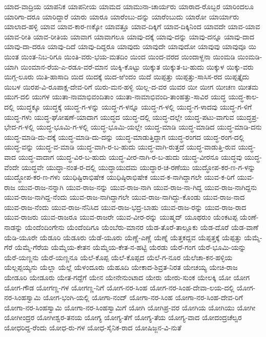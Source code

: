 ಯಾದ-ವಾದ್ರಿಯ
ಯಾಪನಿಕ
ಯಾಪನೀಯ
ಯಾಮದ
ಯಾಮುನಾ-ಚಾರ್ಯರು
ಯಾರಾದ-ರೊಬ್ಬರ
ಯಾರಿಂದಲೂ
ಯಾರಿಗಾ-ದರೂ
ಯಾರಿದ್ದಾರೆ
ಯಾರು
ಯಾರೂ
ಯಾರೆಂಬು-ದನ್ನು
ಯಾರೆಂಬುದು
ಯಾರೋ
ಯಾರ್ಯಾರು
ಯಾಲಾದ-ಹಳ್ಳಿ
ಯಾವ
ಯಾವ-ಕಾರ-ಣಕ್ಕೋ
ಯಾವತ್ತೂ
ಯಾವ-ದಿಕ್ಕಿಗೆ
ಯಾವ-ದಿಕ್ಕಿನಿಂದ
ಯಾವದೇ
ಯಾವ-ಯಾವ
ಯಾವ-ರೀತಿ
ಯಾವ-ರೀತಿಯ
ಯಾವಾಗ
ಯಾವಾಗಲೂ
ಯಾವು-ದಕ್ಕೆ
ಯಾವು-ದನ್ನು
ಯಾವು-ದನ್ನೂ
ಯಾವು-ದಾದ
ಯಾವು-ದಾ-ದರೂ
ಯಾವು-ದಿದೆ
ಯಾವು-ದಿದ್ದರೂ
ಯಾವುದು
ಯಾವುದೇ
ಯಾವುದೋ
ಯಾವುವು
ಯಾವುವೂ
ಯಿ
ಯಿಂತ
ಯಿಂತ-ನಿಬ-ರಿಗೂ
ಯಿಂತಿ-ವರು-ಭಯ-ಮತದಿಂ
ಯಿಂದ
ಯಿಂದ-ವರದ
ಯಿಂದಾಳ್ದನಾ
ಯಿಂಮಡಿ
ಯಿಂಮಡಿ-ಯಾಗಿ
ಯಿಂಮಾನ-ರೆಯ-ಎ-ರಡೂ-ವರೆ-ಮಾನ
ಯಿಕ್ಕಿ-ಕೊಟ್ಟು
ಯಿಕ್ಕುತ
ಯಿಕ್ಕುತ-ಬ-ಹುದು
ಯಿಕ್ಕುಳ
ಯಿಕ್ಕು-ವರು
ಯಿಗ್ಗ-ಲೂರು
ಯಿತಿ-ಹಾಸಾದಿ
ಯಿದ
ಯಿದಕ್ಕೆ
ಯಿದ-ಱಿಂದಂ
ಯಿದೆ
ಯಿಪ್ಪತ್ತು
ಯಿಪ್ಪತ್ತು-ಸಾಸಿಸ-ರದ
ಯಿಪ್ಪತ್ತೈದು
ಯಿಬಳ
ಯಿರಪ-ವಿ-ರೂಪಾಕ್ಷ-ದೇವ-ರಿಗೆ
ಯಿರು-ಮನ-ಹಳ್ಳಿ
ಯಿಲ್ಲ-ದ-ವರ
ಯಿವರ
ಯೀ
ಯೀಗ
ಯೀಚಣ
ಯೀತಮ
ಯುಗ-ದಲಿ
ಯುಗಳ
ಯುತಾ-ನಾಮಾಭಿವಂದಿತಾಂ
ಯುತಾ-ನಾಮಾಭಿವಂದಿ-ತಾಂಹತ್ತು-ಸಾವಿರ
ಯುದ್ಧ
ಯುದ್ಧ-ಕಾಲ-ದಲ್ಲಿ
ಯುದ್ಧಕ್ಕೂ
ಯುದ್ಧಕ್ಕೆ
ಯುದ್ಧ-ಗ-ಳನ್ನು
ಯುದ್ಧ-ಗ-ಳನ್ನೂ
ಯುದ್ಧ-ಗ-ಳಲ್ಲಿ
ಯುದ್ಧ-ಗ-ಳಾದವು
ಯುದ್ಧ-ಗ-ಳಿಗೆ
ಯುದ್ಧ-ಗಳು
ಯುದ್ಧ-ಘೋಷಣೆ-ಯಾದಾಗ
ಯುದ್ಧದ
ಯುದ್ಧ-ದಲ್ಲಿ
ಯುದ್ಧ-ದಲ್ಲೇ
ಯುದ್ಧ-ಪಟು-ವಾಗುವ
ಯುದ್ಧಪ್ರ-ಭೇದ-ಗ-ಳಲ್ಲಿ
ಯುದ್ಧ-ಭೂಮಿ-ಗ-ಳಲ್ಲಿ
ಯುದ್ಧ-ಭೂಮಿ-ಯಲ್ಲೇ
ಯುದ್ಧ-ಮಾಡಿ
ಯುದ್ಧ-ಮಾಡಿದ
ಯುದ್ಧ-ಮಾಡಿ-ದನು
ಯುದ್ಧ-ಮಾಡಿ-ದು-ದಕ್ಕೆ
ಯುದ್ಧ-ಮಾಡಿ-ದು-ದನ್ನು
ಯುದ್ಧ-ಮಾಡುತ್ತಿದ್ದಾಗ
ಯುದ್ಧ-ರಂಗದ
ಯುದ್ಧ-ರಂಗ-ದಲ್ಲಿ
ಯುದ್ಧ-ವನ್ನು
ಯುದ್ಧ-ವ-ಮಾಡಿ
ಯುದ್ಧ-ವಾಗಿ-ರ-ಬ-ಹುದು
ಯುದ್ಧ-ವಾಗಿ-ರುತ್ತದೆ
ಯುದ್ಧ-ವಾಡುತ್ತಿ-ರುವ
ಯುದ್ಧ-ವಾದ
ಯುದ್ಧ-ವಾದಾಗ
ಯುದ್ಧ-ವಿರ-ಬ-ಹುದು
ಯುದ್ಧ-ವೀರ-ನಾಗಿ-ರ-ಬ-ಹುದು
ಯುದ್ಧ-ವೀರನೂ
ಯುದ್ಧವು
ಯುದ್ಧ-ವೆಂದೇ
ಯುದ್ಧವೇ
ಯುದ್ಧಾ-ನಂತ-ರ-ದಲ್ಲಿ
ಯುದ್ಧಾಯುದಮ
ಯುದ್ಧಾರ-ಚ-ರಣೆಯು
ಯುದ್ಧೋಪ-ಕರ-ಣ-ಗ-ಳನ್ನು
ಯುದ್ಧೋಪ-ಕರ-ಣ-ಗಳು
ಯುಧಿಷ್ಟಿರಾಭಿಷೇಕ
ಯುಧಿಷ್ಠಿರಾಭಿಷೇಕ
ಯುವ-ಕ-ನಾಗಿದ್ದಾಗಲೇ
ಯುವ-ಕ-ರಿಗೆ
ಯುವ-ರಾಜ
ಯುವ-ರಾಜ-ನನ್ನಾಗಿ
ಯುವ-ರಾಜ-ನನ್ನು
ಯುವ-ರಾಜ-ನಾಗಿ
ಯುವ-ರಾಜ-ನಾ-ಗಿದ್ದ
ಯುವ-ರಾಜ-ನಾಗಿದ್ದನು
ಯುವ-ರಾಜ-ನಾಗಿದ್ದ-ನೆಂದು
ಯುವ-ರಾಜ-ನಾಗಿದ್ದಾಗಲೇ
ಯುವ-ರಾಜ-ನಾಗಿದ್ದು-ಕೊಂಡು
ಯುವ-ರಾಜ-ನಾದ
ಯುವ-ರಾಜ-ನೆಂದು
ಯುವ-ರಾಜ-ನೆನಿಸಿದ
ಯುವ-ರಾಜ-ಭದ್ರ-ಬಾಹು
ಯುವ-ರಾಜ-ರನ್ನು
ಯುವ-ರಾಜ-ರಾದ
ಯುವ-ರಾಜರು
ಯುವ-ರಾಜರೂ
ಯುವ-ರಾಜರೇ
ಯುವ-ವೀರ-ರನ್ನು
ಯುಷ್ಮದ್
ಯೂಥರುಂ
ಯೆಂಕಟಪ್ಪ
ಯೆಂಣೆ-ನಾಡನ್ನು
ಯೆಂದೆಂದಿಂಗೇನು
ಯೆಂದೆಂದಿಗೂ
ಯೆಂಬೆರು-ಮಾನರ
ಯೆಡ-ತೊರೆ-ತಾಲ್ಲೂಕು
ಯೆಡ-ದೊರೆ
ಯೆಡ-ವಾಣೆ
ಯೆಡಿ-ಯೂರೇ
ಯೆಡೂರಿ
ಯೆಡೂರು
ಯೆಡೆ-ಯೂರು
ಯೆಣ್ಣೆ-ಎಣ್ಣೆ
ಯೆಣ್ನೆ
ಯೆತ್ತಕದ್ದವ
ಯೆಪ್ಪತ್ತಕ್ಕೆ
ಯೆಪ್ಪತ್ತು
ಯೆಮ್ಮೆ-ಗೆರೆ
ಯೆಮ್ಮೆ-ಗೆರೆಯ
ಯೆಮ್ಮೆಯ-ಕೇತನ
ಯೆಮ್ಮೆಯ-ಕೇತ-ನ-ಹಟ್ಟಿ
ಯೆರಡು
ಯೆರೆ-ಗಂಗ
ಯೆರೆ-ಭೂಮಿ-ಯನ್ನು
ಯೆರೆ-ಯಣ್ಣನು
ಯೆರೆ-ಯಣ್ಣನೂ
ಯೆಲೆ-ಕೊಪ್ಪ
ಯೆಲೆ-ಕೊಪ್ಪದ
ಯೆಲೆ-ಗ-ನೂರ
ಯೆಲೆಚಾ-ಕನ-ಹಳ್ಳಿಯ
ಯೆಲ್ಲಪ್ಪಯ್ಯನು
ಯೆಲ್ಲಾ
ಯೆಲ್ಲೆ
ಯೆಳಂದೂರು
ಯೆಹೂದಿ
ಯೇಕಾದ-ಶಿವ್ರತ-ನಿರತ
ಯೇಚಯ್ಯ
ಯೇಚಿ-ರಾಜ
ಯೇಡೂರಿ
ಯೇಡೂರು
ಯೇತ-ಗದ್ದೆಗೆ
ಯೇನ
ಯೇನೇನುಂಟಾದ
ಯೇರು
ಯೇರು-ಸುಂಕ
ಯೇಲಕ್ಕಿ
ಯೋ
ಯೋಗ
ಯೋಗ-ಗೌಡ
ಯೋಗಣ್ಣ-ಗಳ
ಯೋಗಣ್ಣ-ನಿಗೆ
ಯೋಗ-ನರ-ಸಿಂಹ
ಯೋಗ-ನರ-ಸಿಂಹ-ದೇವಾ-ಲಯ-ದಲ್ಲಿ
ಯೋಗ-ನರ-ಸಿಂಹಸ್ವಾಮಿ
ಯೋಗ-ಭಂಗಿ-ಯಲ್ಲಿ
ಯೋಗಾ-ನಂದ್
ಯೋಗಾ-ನರ-ಸಿಂಹ
ಯೋಗಾ-ನರ-ಸಿಂಹ-ದೇವ-ರಿಗೆ
ಯೋಗಾ-ನರ-ಸಿಂಹಸ್ವಾಮಿ
ಯೋಗಾ-ನರ-ಸಿಂಹಸ್ವಾಮಿಗೆ
ಯೋಗಿ
ಯೋಗಿಪ್ರ-ವರ
ಯೋಗಿಯ
ಯೋಗಿಯು
ಯೋಗೀ
ಯೋಗೀಂದ್ರರ
ಯೋಗೀಶ್ವರ-ತನಯ
ಯೋಗ್ಯ
ಯೋಗ್ಯ-ತೆಗೆ
ಯೋಗ್ಯ-ತೆಯ
ಯೋಗ್ಯ-ವಾದ
ಯೋದಂದ್ರಚೆಲ್ವರ
ಯೋಧರಿದ್ದ-ರೆಂದು
ಯೋಧ-ರು-ಗಳ
ಯೋಧ-ಸೈನಿಕ-ರಾದ
ಯೋಷಿಜ್ಜನ-ವಿ-ನುತೆ

